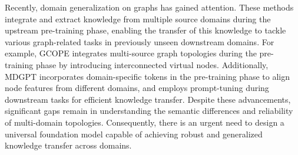 Recently, domain generalization on graphs has gained attention. These methods integrate and extract knowledge from multiple source domains during the upstream pre-training phase, enabling the transfer of this knowledge to tackle various graph-related tasks in previously unseen downstream domains.
For example, GCOPE \cite{zhao2024all} integrates multi-source graph topologies during the pre-training phase by introducing interconnected virtual nodes. Additionally, MDGPT \cite{yu2025samgpt} incorporates domain-specific tokens in the pre-training phase to align node features from different domains, and employs prompt-tuning during downstream tasks for efficient knowledge transfer. Despite these advancements, significant gaps remain in understanding the semantic differences and reliability of multi-domain topologies. Consequently, there is an urgent need to design a universal foundation model capable of achieving robust and generalized knowledge transfer across domains.